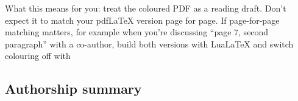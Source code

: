 \documentclass[11pt]{article}
\begin{document}
\lipsum[4-7]

\lipsum[8]

What this means for you: treat the coloured PDF as a reading draft.
Don’t expect it to match your pdfLaTeX version page for page.
If page-for-page matching matters, for example when you’re discussing “page 7, second paragraph” with a co-author, build both versions with LuaLaTeX and switch colouring off with


\subsection*{Authorship summary}
\AuthorshipSummary
\end{document}
